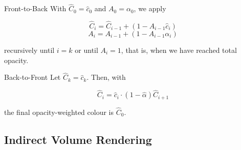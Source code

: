 \documentclass{panikzettel}
\begin{document}
\begin{halfboxl}
\vspace{-\baselineskip}
\begin{defi}{Front-to-Back}
With $\hat C_0 = \hat c_0$ and $A_0 = \alpha_0$, we apply

$$\hat C_i = \hat C_{i-1} + (1 - A_{i-1} \hat c_i)$$
$$A_i = A_{i-1} + (1 - A_{i-1} \alpha_i)$$

recursively until $i = k$ or until $A_i = 1$, that is, when we have reached total opacity.
\end{defi}
\end{halfboxl}%
\begin{halfboxr}
\vspace{-\baselineskip}
\begin{defi}{Back-to-Front}
Let $\hat C_k = \hat c_k$. Then, with

$$\hat C_i = \hat c_i \cdot (1 - \hat \alpha) \hat C_{i+1}$$

the final opacity-weighted colour is $\hat C_0$.
\end{defi}
\end{halfboxr}

\subsection{Indirect Volume Rendering}
\end{document}
